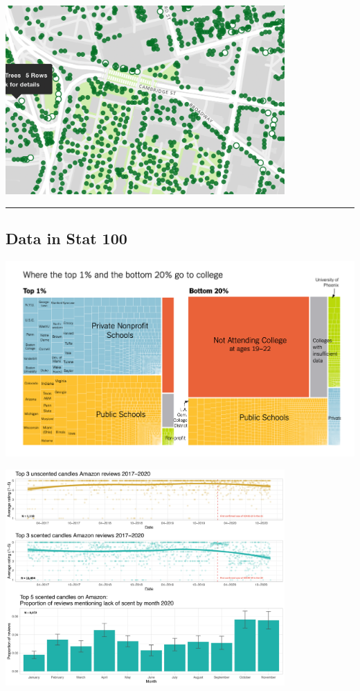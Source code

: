\documentclass[
  letterpaper,
  DIV=11,
  numbers=noendperiod]{scrartcl}
\begin{document}
\includegraphics[width=0.8\textwidth,height=\textheight]{img/cambridge_trees.png}

\begin{center}\rule{0.5\linewidth}{0.5pt}\end{center}

\hypertarget{data-in-stat-100-1}{%
\subsection{Data in Stat 100}\label{data-in-stat-100-1}}

\includegraphics[width=1\textwidth,height=\textheight]{img/nytimes_opp_insights.png}

\includegraphics[width=0.8\textwidth,height=\textheight]{img/kate_petrova_candles.jpg}
\end{document}
